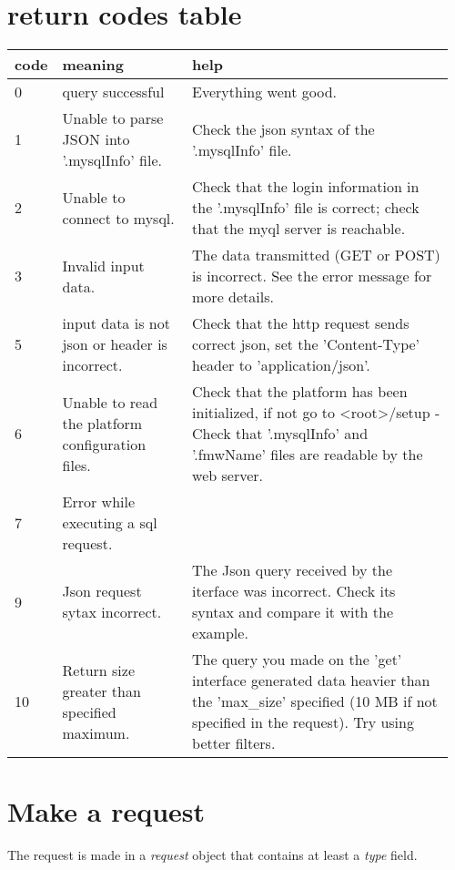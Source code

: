 \documentclass[notitlepage]{report}
\begin{document}
\section{return codes table}
\begin{tabular}{|p{0.035\linewidth}|p{0.3\linewidth}|p{0.62\linewidth}|}
\hline
\bf{code} & \bf{meaning} & \bf{help}\\
\hline
0 & query successful & Everything went good.\\
\hline
1 & Unable to parse JSON into '.mysqlInfo' file. & Check the json syntax of the '.mysqlInfo' file.\\
\hline
2 & Unable to connect to mysql. & Check that the login information in the '.mysqlInfo' file is correct; check that the myql server is reachable.\\
\hline
3 & Invalid input data. & The data transmitted (GET or POST) is incorrect. See the error message for more details.\\
\hline
5 & input data is not json or header is incorrect. & Check that the http request sends correct json, set the 'Content-Type' header to 'application/json'.\\
\hline
6 & Unable to read the platform configuration files. & Check that the platform has been initialized, if not go to <root>/setup - Check that '.mysqlInfo' and '.fmwName' files are readable by the web server.\\
\hline
7 & Error while executing a sql request.&\\
\hline
9 & Json request sytax incorrect.& The Json query received by the iterface was incorrect. Check its syntax and compare it with the example.\\
\hline
10 & Return size greater than specified maximum. & The query you made on the 'get' interface generated data heavier than the 'max\_size' specified (10 MB if not specified in the request). Try using better filters.\\
\hline
\end{tabular}

\section{Make a request}
The request is made in a \emph{request} object that contains at least a \emph{type} field.
\end{document}

